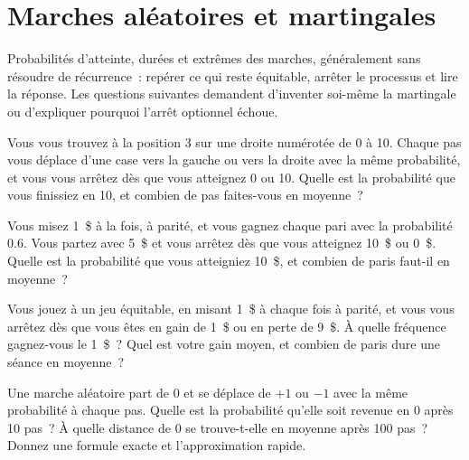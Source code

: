 \chapter{Marches aléatoires et martingales}\label{ch:iv1:random-walks-and-martingales}

\begin{ivtrains}
Probabilités d'atteinte, durées et extrêmes des marches, généralement sans résoudre de récurrence~: repérer ce qui reste équitable, arrêter le processus et lire la réponse. Les questions suivantes demandent d'inventer soi-même la martingale ou d'expliquer pourquoi l'arrêt optionnel échoue.
\end{ivtrains}

\begin{question}\label{iq:iv1:random-walks-and-martingales:1}
Vous vous trouvez à la position 3 sur une droite numérotée de 0 à 10. Chaque pas vous déplace d'une case vers la gauche ou vers la droite avec la même probabilité, et vous vous arrêtez dès que vous atteignez 0 ou 10. Quelle est la probabilité que vous finissiez en 10, et combien de pas faites-vous en moyenne~?
\end{question}

\begin{question}\label{iq:iv1:random-walks-and-martingales:2}
Vous misez 1~\$ à la fois, à parité, et vous gagnez chaque pari avec la probabilité $0.6$. Vous partez avec 5~\$ et vous arrêtez dès que vous atteignez 10~\$ ou 0~\$. Quelle est la probabilité que vous atteigniez 10~\$, et combien de paris faut-il en moyenne~?
\end{question}

\begin{question}\label{iq:iv1:random-walks-and-martingales:3}
Vous jouez à un jeu équitable, en misant 1~\$ à chaque fois à parité, et vous vous arrêtez dès que vous êtes en gain de 1~\$ ou en perte de 9~\$. À quelle fréquence gagnez-vous le 1~\$~? Quel est votre gain moyen, et combien de paris dure une séance en moyenne~?
\end{question}

\begin{question}\label{iq:iv1:random-walks-and-martingales:4}
Une marche aléatoire part de 0 et se déplace de $+1$ ou $-1$ avec la même probabilité à chaque pas. Quelle est la probabilité qu'elle soit revenue en 0 après 10 pas~? À quelle distance de 0 se trouve-t-elle en moyenne après 100 pas~? Donnez une formule exacte et l'approximation rapide.
\end{question}

